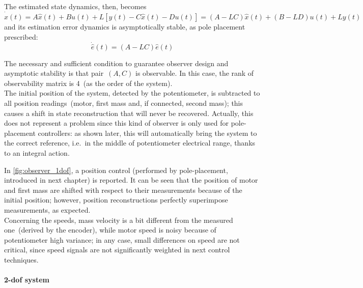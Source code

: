 The estimated state dynamics, then, becomes
\begin{equation}
	\dot{\hat{x}}(t) = A\hat{x}(t) + Bu(t) + L [y(t) - C\hat{x}(t) - Du(t)] = (A-LC)\hat{x}(t) + (B-LD)u(t) + Ly(t)
	\label{eqn:est_state_dyn}
\end{equation}
and its estimation error dynamics is asymptotically stable, as pole placement prescribed:
\begin{equation}
	\dot{\hat{e}} (t) = (A-LC) \hat{e} (t)
\end{equation}

The necessary and sufficient condition to guarantee observer design and asymptotic stability is that pair~$(A,C)$ is observable. In this case, the rank of observability matrix is 4~(as the order of the system). \\

The initial position of the system, detected by the potentiometer, is subtracted to all position readings~(motor, first mass and, if connected, second mass); this causes a shift in state reconstruction that will never be recovered. Actually, this does not represent a problem since this kind of observer is only used for pole-placement controllers: as shown later, this will automatically bring the system to the correct reference, i.e.\ in the middle of potentiometer electrical range, thanks to an integral action.

In \cref{fig:observer_1dof}, a position control (performed by pole-placement, introduced in next chapter) is reported. It can be seen that the position of motor and first mass are shifted with respect to their measurements because of the initial position; however, position reconstructions perfectly superimpose measurements, as expected.\\
Concerning the speeds, mass velocity is a bit different from the measured one~(derived by the encoder), while motor speed is noisy because of potentiometer high variance; in any case, small differences on speed are not critical, since speed signals are not significantly weighted in next control techniques.

\paragraph{\acrshort{2-dof} system}

